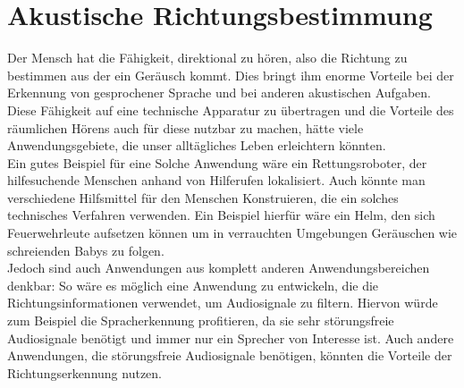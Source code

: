 \section{Akustische Richtungsbestimmung}
Der Mensch hat die Fähigkeit, direktional zu hören, also die Richtung zu bestimmen aus der ein Geräusch kommt. Dies bringt ihm enorme Vorteile bei der Erkennung von gesprochener Sprache und bei anderen akustischen Aufgaben. Diese Fähigkeit auf eine technische Apparatur zu übertragen und die Vorteile des räumlichen Hörens auch für diese nutzbar zu machen, hätte viele Anwendungsgebiete, die unser alltägliches Leben erleichtern könnten.\\
Ein gutes Beispiel für eine Solche Anwendung wäre ein Rettungsroboter, der hilfesuchende Menschen anhand von Hilferufen lokalisiert. Auch könnte man verschiedene Hilfsmittel für den Menschen Konstruieren, die ein solches technisches Verfahren verwenden. Ein Beispiel hierfür wäre ein Helm, den sich Feuerwehrleute aufsetzen können um in verrauchten Umgebungen Geräuschen wie schreienden Babys zu folgen.\\
Jedoch sind auch Anwendungen aus komplett anderen Anwendungsbereichen denkbar: So wäre es möglich eine Anwendung zu entwickeln, die die Richtungsinformationen verwendet, um Audiosignale zu filtern. Hiervon würde zum Beispiel die Spracherkennung profitieren, da sie sehr störungsfreie Audiosignale benötigt und immer nur ein Sprecher von Interesse ist\cite{Spracherkennung}. Auch andere Anwendungen, die störungsfreie Audiosignale benötigen, könnten die Vorteile der Richtungserkennung nutzen. 
